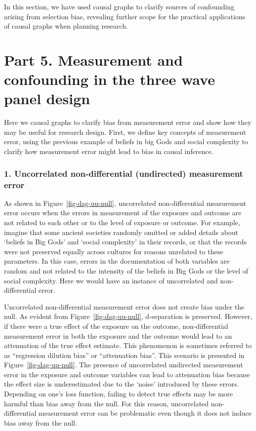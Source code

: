 \documentclass[
  singlecolumn]{report}
\begin{document}
In this section, we have used causal graphs to clarify sources of
confounding arising from selection bias, revealing further scope for the
practical applications of causal graphs when planning research.

\hypertarget{part-5.-measurement-and-confounding-in-the-three-wave-panel-design}{%
\section{Part 5. Measurement and confounding in the three wave panel
design}\label{part-5.-measurement-and-confounding-in-the-three-wave-panel-design}}

Here we causal graphs to clarify bias from measurement error and show
how they may be useful for research design. First, we define key
concepts of measurement error, using the previous example of beliefs in
big Gods and social complexity to clarify how measurement error might
lead to bias in causal inference.

\hypertarget{uncorrelated-non-differential-undirected-measurement-error}{%
\subsubsection{\texorpdfstring{1. \textbf{Uncorrelated non-differential
(undirected) measurement
error}}{1. Uncorrelated non-differential (undirected) measurement error}}\label{uncorrelated-non-differential-undirected-measurement-error}}

As shown in Figure~\ref{fig-dag-uu-null}, uncorrelated non-differential
measurement error occurs when the errors in measurement of the exposure
and outcome are not related to each other or to the level of exposure or
outcome. For example, imagine that some ancient societies randomly
omitted or added details about `beliefs in Big Gods' and `social
complexity' in their records, or that the records were not preserved
equally across cultures for reasons unrelated to these parameters. In
this case, errors in the documentation of both variables are random and
not related to the intensity of the beliefs in Big Gods or the level of
social complexity. Here we would have an instance of uncorrelated and
non-differential error.

Uncorrelated non-differential measurement error does not create bias
under the null. As evident from Figure~\ref{fig-dag-uu-null},
d-separation is preserved. However, if there were a true effect of the
exposure on the outcome, non-differential measurement error in both the
exposure and the outcome would lead to an attenuation of the true effect
estimate. This phenomenon is sometimes referred to as ``regression
dilution bias'' or ``attenuation bias''. This scenario is presented in
Figure~\ref{fig-dag-uu-null}. The presence of uncorrelated undirected
measurement error in the exposure and outcome variables can lead to
attenuation bias because the effect size is underestimated due to the
`noise' introduced by these errors. Depending on one's loss function,
failing to detect true effects may be more harmful than bias away from
the null. For this reason, uncorrelated non-differential measurement
error can be problematic even though it does not induce bias away from
the null.
\end{document}
